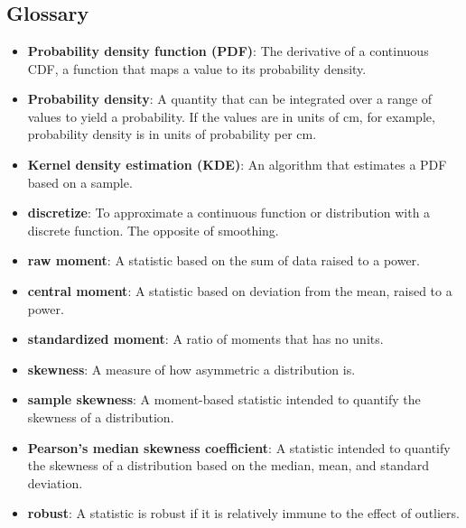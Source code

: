  \chapter{ }  \section*{Glossary} \begin{itemize}
	
	\item {\bf Probability density function (PDF)}: The derivative of a continuous CDF,
	a function that maps a value to its probability density.
	
	\item {\bf Probability density}: A quantity that can be integrated over a
	range of values to yield a probability.  If the values are in units
	of cm, for example, probability density is in units of probability
	per cm.
	
	\item {\bf Kernel density estimation (KDE)}: An algorithm that estimates a PDF
	based on a sample.
	
	\item {\bf discretize}: To approximate a continuous function or distribution
	with a discrete function.  The opposite of smoothing.
	
	\item {\bf raw moment}: A statistic based on the sum of data raised to a power.
	
	\item {\bf central moment}: A statistic based on deviation from the mean,
	raised to a power.
	
	\item {\bf standardized moment}: A ratio of moments that has no units.
	
	\item {\bf skewness}: A measure of how asymmetric a distribution is.
	
	\item {\bf sample skewness}: A moment-based statistic intended to quantify
	the skewness of a distribution.
	
	\item {\bf Pearson's median skewness coefficient}: A statistic intended to
	quantify the skewness of a distribution based on the median, mean,
	and standard deviation.
	
	\item {\bf robust}: A statistic is robust if it is relatively immune to the
	effect of outliers.
	
\end{itemize}

